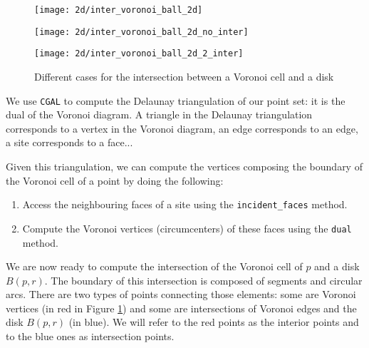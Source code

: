 \begin{figure}[h]
    \centering
    \begin{minipage}{0.32\linewidth}
        \centering
        \texttt{[image: 2d/inter\_voronoi\_ball\_2d]}
        \label{fig:inter_voronoi_ball_2d:a}
    \end{minipage}
    \begin{minipage}{0.32\linewidth}
        \centering
        \texttt{[image: 2d/inter\_voronoi\_ball\_2d\_no\_inter]}
        \label{fig:inter_voronoi_ball_2d:b}
    \end{minipage}
    \begin{minipage}{0.32\linewidth}
        \centering
        \texttt{[image: 2d/inter\_voronoi\_ball\_2d\_2\_inter]}
        \label{fig:inter_voronoi_ball_2d:c}
    \end{minipage}

   \caption{Different cases for the intersection between a Voronoi cell and a
       disk}
   \label{fig:inter_voronoi_ball_2d}
\end{figure}

We use \texttt{CGAL} to compute the Delaunay triangulation of our point set: it
is the dual of the Voronoi diagram. A triangle in the Delaunay
triangulation corresponds to a vertex in the Voronoi diagram, an edge
corresponds to an edge, a site corresponds to a face...

Given this triangulation, we can compute the vertices composing the boundary of
the  Voronoi cell of a point by doing the following:
\begin{enumerate}
    \item Access the neighbouring faces of a site using the
        \texttt{incident\_faces} method.
    \item Compute the Voronoi vertices (circumcenters) of these faces using the
        \texttt{dual} method.
\end{enumerate}

We are now ready to compute the intersection of the Voronoi cell of $ p $ and a
disk $ B(p, r) $. The boundary of this intersection is composed of segments and
circular arcs. There are two types of points connecting those elements: some are
Voronoi vertices (in red in Figure \ref{fig:inter_voronoi_ball_2d}) and some are
intersections of Voronoi edges and the disk $ B(p, r) $ (in blue). We will refer
to the red points as the interior points and to the blue ones as intersection
points.

